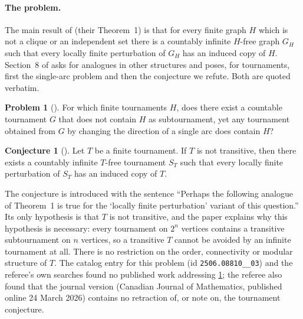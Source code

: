 \documentclass[11pt,a4paper]{article}
\theoremstyle{plain}
\theoremstyle{definition}
\newtheorem{conjecture}[theorem]{Conjecture}
\newtheorem{problem}[theorem]{Problem}
\theoremstyle{remark}
\begin{document}
\paragraph{The problem.}
The main result of \cite{BGJMS25} (their Theorem~1) is that for every finite graph $H$ which is not a clique or an independent set there is a countably infinite $H$-free graph $G_H$ such that every locally finite perturbation of $G_H$ has an induced copy of $H$. Section~8 of \cite{BGJMS25} asks for analogues in other structures and poses, for tournaments, first the single-arc problem and then the conjecture we refute. Both are quoted verbatim.

\begin{problem}[{\cite[Problem~23]{BGJMS25}}]\label{prob:23}
For which finite tournaments $H$, does there exist a countable tournament $G$ that does not contain $H$ as subtournament, yet any tournament obtained from $G$ by changing the direction of a single arc does contain $H$?
\end{problem}

\begin{conjecture}[{\cite[Conjecture~24]{BGJMS25}}]\label{conj:24}
Let $T$ be a finite tournament. If $T$ is not transitive, then there exists a countably infinite $T$-free tournament $S_{T}$ such that every locally finite perturbation of $S_{T}$ has an induced copy of $T$.
\end{conjecture}

The conjecture is introduced with the sentence ``Perhaps the following analogue of Theorem~1 is true for the `locally finite perturbation' variant of this question.'' Its only hypothesis is that $T$ is not transitive, and the paper explains why this hypothesis is necessary: every tournament on $2^n$ vertices contains a transitive subtournament on $n$ vertices, so a transitive $T$ cannot be avoided by an infinite tournament at all. There is no restriction on the order, connectivity or modular structure of $T$. The catalog entry for this problem (id \texttt{2506.08810\_\_03}) and the referee's own searches found no published work addressing \cref{conj:24}; the referee also found that the journal version (Canadian Journal of Mathematics, published online 24 March 2026) contains no retraction of, or note on, the tournament conjecture.
\end{document}
